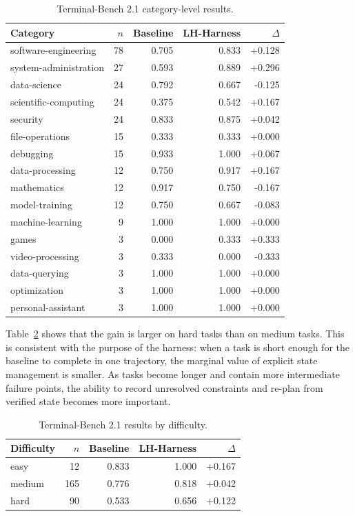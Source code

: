 \begin{table}[t]
\caption{Terminal-Bench 2.1 category-level results.}
\label{tab:terminalbench-category-breakdown}
\centering
\small
\setlength{\tabcolsep}{5pt}
\begin{tabular}{lrrrr}
\toprule
Category & $n$ & Baseline & LH-Harness & $\Delta$ \\
\midrule
software-engineering & 78 & 0.705 & 0.833 & +0.128 \\
system-administration & 27 & 0.593 & 0.889 & +0.296 \\
data-science & 24 & 0.792 & 0.667 & -0.125 \\
scientific-computing & 24 & 0.375 & 0.542 & +0.167 \\
security & 24 & 0.833 & 0.875 & +0.042 \\
file-operations & 15 & 0.333 & 0.333 & +0.000 \\
debugging & 15 & 0.933 & 1.000 & +0.067 \\
data-processing & 12 & 0.750 & 0.917 & +0.167 \\
mathematics & 12 & 0.917 & 0.750 & -0.167 \\
model-training & 12 & 0.750 & 0.667 & -0.083 \\
machine-learning & 9 & 1.000 & 1.000 & +0.000 \\
games & 3 & 0.000 & 0.333 & +0.333 \\
video-processing & 3 & 0.333 & 0.000 & -0.333 \\
data-querying & 3 & 1.000 & 1.000 & +0.000 \\
optimization & 3 & 1.000 & 1.000 & +0.000 \\
personal-assistant & 3 & 1.000 & 1.000 & +0.000 \\
\bottomrule
\end{tabular}
\end{table}

Table~\ref{tab:terminalbench-difficulty-breakdown} shows that the gain is larger on hard tasks than on medium tasks. This is consistent with the purpose of the harness: when a task is short enough for the baseline to complete in one trajectory, the marginal value of explicit state management is smaller. As tasks become longer and contain more intermediate failure points, the ability to record unresolved constraints and re-plan from verified state becomes more important.

\begin{table}[t]
\caption{Terminal-Bench 2.1 results by difficulty.}
\label{tab:terminalbench-difficulty-breakdown}
\centering
\small
\setlength{\tabcolsep}{7pt}
\begin{tabular}{lrrrr}
\toprule
Difficulty & $n$ & Baseline & LH-Harness & $\Delta$ \\
\midrule
easy & 12 & 0.833 & 1.000 & +0.167 \\
medium & 165 & 0.776 & 0.818 & +0.042 \\
hard & 90 & 0.533 & 0.656 & +0.122 \\
\bottomrule
\end{tabular}
\end{table}

